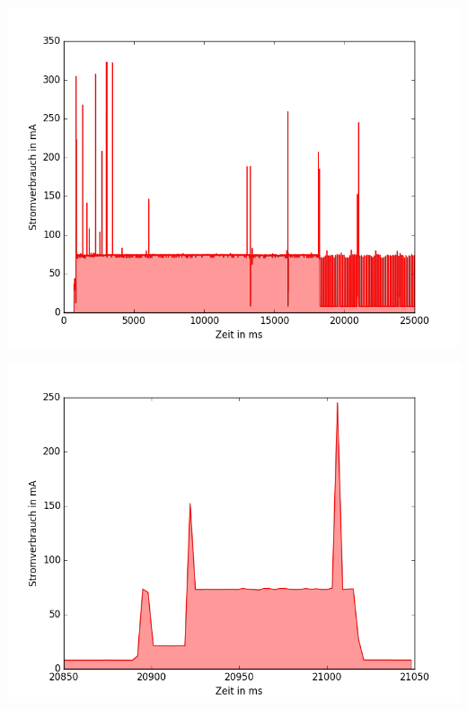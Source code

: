 \documentclass[18pt]{beamer}
\begin{document}
\begin{frame}
	\begin{minipage}[c][\textheight][c]{\textwidth}
		\centering
		\includegraphics[height=0.95\textheight]{plots/radar5s.png}
	\end{minipage}
\end{frame}

\begin{frame}
	\begin{minipage}[c][\textheight][c]{\textwidth}
		\centering
		\includegraphics[height=0.95\textheight]{plots/radar5ssend.png}
	\end{minipage}
\end{frame}
\end{document}
